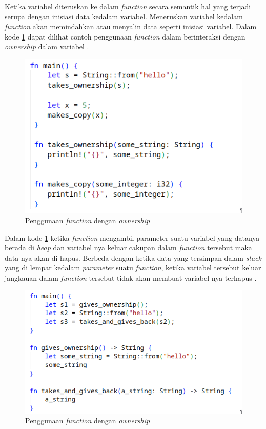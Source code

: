 Ketika variabel diteruskan ke dalam \emph{function} secara semantik hal yang terjadi serupa dengan inisiasi data kedalam variabel. Meneruskan variabel kedalam \emph{function} akan memindahkan atau menyalin data seperti inisiasi variabel. Dalam kode \ref{gambar:rust-function-ownership} dapat dilihat contoh penggunaan \emph{function} dalam berinteraksi dengan \emph{ownership} dalam variabel \citep{rustbook}.

\begin{figure}[H]
  \centering
	\includegraphics[keepaspectratio, width=12cm]{gambar/function-ownership.png}
  \caption{Penggunaan \emph{function} dengan \emph{ownership} \citep{rustbook}}
	\label{gambar:rust-function-ownership}
\end{figure}

Dalam kode \ref{gambar:rust-function-ownership} ketika \emph{function} mengambil parameter suatu variabel yang datanya berada di \emph{heap} dan variabel nya keluar cakupan dalam \emph{function} tersebut maka data-nya akan di hapus. Berbeda dengan ketika data yang tersimpan dalam \emph{stack} yang di lempar kedalam \emph{parameter} suatu \emph{function}, ketika variabel tersebut keluar jangkauan dalam \emph{function} tersebut tidak akan membuat variabel-nya terhapus \citep{rustbook}.

\begin{figure}[H]
  \centering
	\includegraphics[keepaspectratio, width=12cm]{gambar/return-value-scope.png}
  \caption{Penggunaan \emph{function} dengan \emph{ownership} \citep{rustbook}}
	\label{gambar:rust-ownership-return}
\end{figure}

